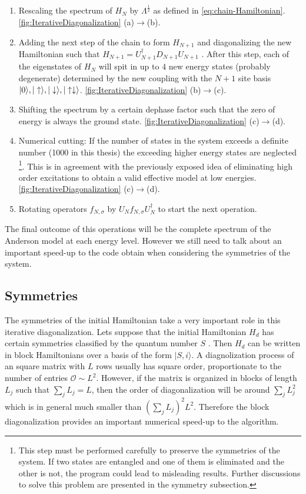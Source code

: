\begin{enumerate}
 	\item Rescaling the spectrum of $H_{N}$ by $\Lambda^{\frac{1}{2}}$ as defined in \eqref{eq:chain-Hamiltonian}. \ref{fig:IterativeDiagonalization} (a)$\rightarrow$(b).
 	\item Adding the next step of the chain to form $H_{N+1}$ and diagonalizing the new Hamiltonian such that $H_{N+1} = U_{N+1}^\dagger D_{N+1} U_{N+1}$ . After this step, each of the eigenstates of $H_{N}$ will spit in up to $4$ new energy states (probably degenerate) determined by the new coupling with the  $N+1$ site basis ${\vert 0 \rangle, \vert \uparrow \rangle, \vert \downarrow \rangle, \vert \uparrow \downarrow \rangle}$.  \ref{fig:IterativeDiagonalization} (b)$\rightarrow$(c).
 	\item Shifting the spectrum by a certain dephase factor such that the zero of energy is always the ground state.  \ref{fig:IterativeDiagonalization} (c)$\rightarrow$(d).
 	\item Numerical cutting: If the number of states in the system exceeds a definite number (1000 in this thesis) the exceeding higher energy states are neglected \footnote{ This step must be performed carefully to preserve the symmetries of the system. If two states are entangled and one of them is eliminated and the other is not, the program could lead to misleading results. Further discussions to solve this problem are presented in the symmetry subsection.  }. This is in agreement with the previously exposed  idea of eliminating high order excitations to obtain a valid effective model at low energies. \ref{fig:IterativeDiagonalization} (c)$\rightarrow$(d).
 	\item Rotating operators $f_{N,\sigma}$  by $ U_N f_{N,\sigma} U_N^\dagger$ to start the next operation.
\end{enumerate}

The final outcome of this operations will be the complete spectrum of the Anderson model at each energy level. However we still need to talk about an important speed-up to the code obtain when considering the symmetries of the system. 

\subsection{Symmetries \label{subsec:Syms}}

The symmetries of the initial Hamiltonian take a very important role in this iterative diagonalization. Lets suppose that the initial Hamiltonian $H_d$ has certain symmetries classified by the quantum number $S$ . Then $H_d$ can be written  in block Hamiltonians over a basis of the form $\vert S, i\rangle$. A diagnolization process of an square matrix with $L$ rows usually has square order, proportionate to the number of entries $\mathcal{O}\sim L^2$. However, if the matrix is organized in blocks of length $L_j$  such that $\sum_j L_j = L$, then the order of diagonalization will be around $\sum_j L_j^2  $ which is in general much smaller than $(\sum_j L_j)^2 L^2$. Therefore the block diagonalization provides an important numerical speed-up to the algorithm. 

